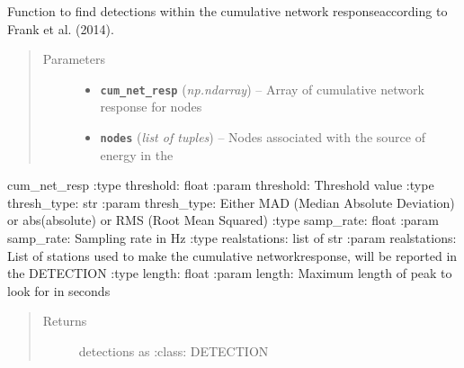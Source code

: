 \documentclass[a4paper,10pt,english]{sphinxmanual}
\begin{document}
\begin{fulllineitems}
\label{submodules/core.bright_lights:bright_lights._find_detections}
Function to find detections within the cumulative network responseaccording to Frank et al. (2014).
\begin{quote}\begin{description}
\item[{Parameters}] \leavevmode\begin{itemize}
\item {} 
\textbf{\texttt{cum\_net\_resp}} (\emph{np.ndarray}) -- Array of cumulative network response for nodes

\item {} 
\textbf{\texttt{nodes}} (\emph{list of tuples}) -- Nodes associated with the source of energy in the

\end{itemize}

\end{description}\end{quote}

cum\_net\_resp
:type threshold: float
:param threshold: Threshold value
:type thresh\_type: str
:param thresh\_type: Either MAD (Median Absolute Deviation) or abs(absolute) or RMS (Root Mean Squared)
:type samp\_rate: float
:param samp\_rate: Sampling rate in Hz
:type realstations: list of str
:param realstations: List of stations used to make the cumulative networkresponse, will be reported in the DETECTION
:type length: float
:param length: Maximum length of peak to look for in seconds
\begin{quote}\begin{description}
\item[{Returns}] \leavevmode
detections as :class: DETECTION

\end{description}\end{quote}

\end{fulllineitems}

\end{document}
